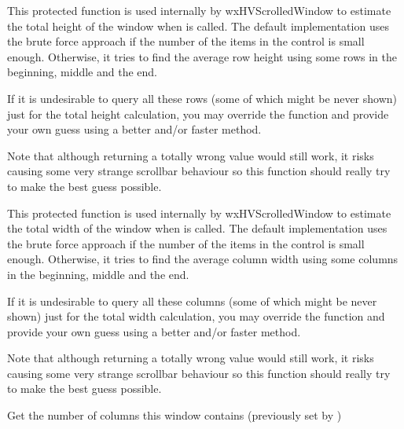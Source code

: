 
This protected function is used internally by wxHVScrolledWindow to estimate the
total height of the window when 
is called. The default implementation uses the brute force approach if the
number of the items in the control is small enough. Otherwise, it tries to find
the average row height using some rows in the beginning, middle and the end.

If it is undesirable to query all these rows (some of which might be never
shown) just for the total height calculation, you may override the function and
provide your own guess using a better and/or faster method.

Note that although returning a totally wrong value would still work, it risks
causing some very strange scrollbar behaviour so this function should really
try to make the best guess possible.


\label{wxhvscrolledwindowestimatetotalwidth}


This protected function is used internally by wxHVScrolledWindow to estimate the
total width of the window when 
is called. The default implementation uses the brute force approach if the
number of the items in the control is small enough. Otherwise, it tries to find
the average column width using some columns in the beginning, middle and the end.

If it is undesirable to query all these columns (some of which might be never
shown) just for the total width calculation, you may override the function and
provide your own guess using a better and/or faster method.

Note that although returning a totally wrong value would still work, it risks
causing some very strange scrollbar behaviour so this function should really
try to make the best guess possible.


\label{wxhvscrolledwindowgetcolumncount}


Get the number of columns this window contains (previously set by 
)


